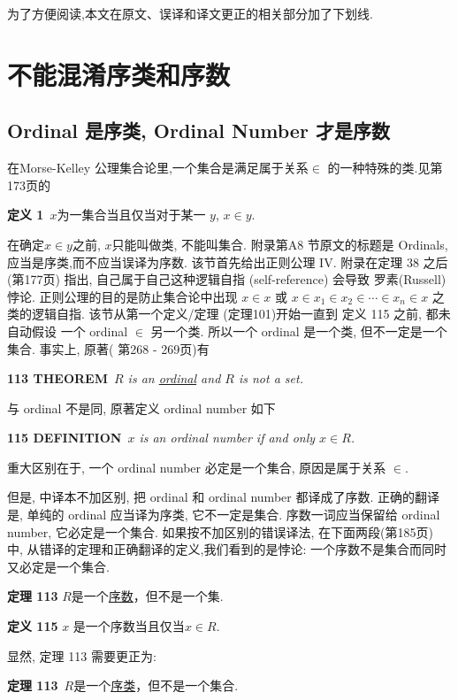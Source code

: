 \documentclass[zihao=-4,a4paper]{ctexart}
\begin{document}
为了方便阅读,本文在原文、误译和译文更正的相关部分加了下划线.
	
\section{不能混淆序类和序数}
\subsection{Ordinal 是序类, Ordinal Number 才是序数}
在Morse-Kelley 公理集合论里,一个集合是满足属于关系$\in$ 的一种特殊的类.见\cite{jkelley2010zh}第173页的

{\bf 定义 1}\, {\kaishu $x$为一集合当且仅当对于某一 $y$, $x\in y$. }

在确定$x\in y$之前, $x$只能叫做类, 不能叫集合.
附录第A8 节原文的标题是 Ordinals,应当是序类,而不应当误译为序数. 该节首先给出正则公理 IV. 附录在定理 38 之后(\cite{jkelley2010zh}第177页) 指出, 自己属于自己这种逻辑自指 (self-reference) 会导致 
罗素(Russell) 悖论. 正则公理的目的是防止集合论中出现 $x\in x$ 或 
$x\in x_1 \in x_2 \in \cdots \in x_n \in x$
之类的逻辑自指. 该节从第一个定义/定理 (定理101)开始一直到 定义 115 之前, 都未自动假设 一个 ordinal $\in$ 另一个类. 所以一个 ordinal 是一个类, 但不一定是一个集合.
事实上, 原著(\cite{jkelley1975} 第268 - 269页)有

{\bf 113 THEOREM}\,
{\sl 
	$R$ is an \underline{ordinal} and $R$ is not a set.
}

\noindent 与 ordinal 不是同, 原著定义 ordinal number 如下

{\bf 115 DEFINITION}\,
{\sl 
	$x$ is an ordinal number if and only $x \in R$.
}

\noindent 重大区别在于, 一个 ordinal number 必定是一个集合, 原因是属于关系 $\in$.

但是, 中译本不加区别, 把 ordinal  和 ordinal number 都译成了序数. 正确的翻译是, 单纯的 ordinal 应当译为{\kaishu 序类}, 它不一定是集合. {\kaishu 序数}一词应当保留给 ordinal number, 它必定是一个集合. 
如果按不加区别的错误译法, 在下面两段(\cite{jkelley2010zh}第185页) 中, 从错译的定理和正确翻译的定义,我们看到的是悖论: 一个序数不是集合而同时又必定是一个集合.

{\bf 定理 113}
{\kaishu
$R$是一个\underline{序数}，但不是一个集.
}

{\bf 定义 115}
{\kaishu
$x$ 是一个序数当且仅当$x\in R$.
}

\noindent 显然, 定理 113 需要更正为:

{\bf 定理 113}\, 
{\kaishu
	$R$是一个\underline{序类}，但不是一个集合.
}
\end{document}
